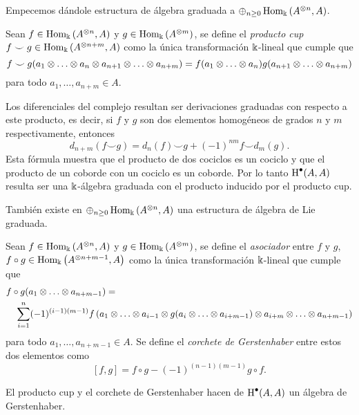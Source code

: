 \documentclass[a4paper,oneside,fleqn,11pt,../tesis.tex]{subfiles}
\begin{document}
Empecemos dándole estructura de álgebra graduada a $\oplus_{n \geq 0}\operatorname{Hom}_{\Bbbk}\left(A^{\otimes n}, A\right)$.
\begin{definition}
	Sean $f \in \operatorname{Hom}_{\Bbbk}\left(A^{\otimes n}, A\right)$ y $g \in \operatorname{Hom}_{\Bbbk}\left(A^{\otimes m}\right)$, se define el \emph{producto cup}
	$f \smile g \in \operatorname{Hom}_{\Bbbk}\left(A^{\otimes n + m}, A\right)$ como la única transformación $\Bbbk$-lineal que cumple que
	\[
		f\smile g(a_1\otimes \ldots \otimes a_n \otimes a_{n + 1} \otimes \ldots \otimes a_{n + m}) = f(a_1\otimes \ldots \otimes a_n)g(a_{n + 1} \otimes \ldots \otimes a_{n + m})
	\]
	para todo $a_1, \ldots, a_{n + m} \in A$.
\end{definition}
Los diferenciales del complejo resultan ser derivaciones graduadas con respecto a este producto, es decir, si $f$ y $g$ son dos
elementos homogéneos de grados $n$ y $m$ respectivamente, entonces
\[
	d_{n + m}(f \smile g) = d_{n}(f) \smile g + (-1)^{nm}f \smile d_{m}(g).
\]
Esta fórmula muestra que el producto de dos cociclos es un cociclo y que el producto de un coborde con un cociclo
es un coborde. Por lo tanto $\operatorname{H}^{\bullet}(A,A)$ resulta ser una $\Bbbk$-álgebra graduada con el producto inducido por el producto cup.

También existe en $\oplus_{n \geq 0}\operatorname{Hom}_{\Bbbk}\left(A^{\otimes n}, A\right)$ una estructura de álgebra de Lie graduada.
\begin{definition}
Sean $f \in \operatorname{Hom}_{\Bbbk}\left(A^{\otimes n}, A\right)$ y $g \in \operatorname{Hom}_{\Bbbk}\left(A^{\otimes m}\right)$, se define el \emph{asociador}
entre $f$ y $g$, $f \circ g \in \operatorname{Hom}_{\Bbbk}\left(A^{\otimes n + m - 1}, A\right)$ como la única transformación $\Bbbk$-lineal que cumple que
	\begin{align*}
		&f \circ g (a_1\otimes \ldots \otimes a_{n + m - 1 }) = \\
		&\quad\sum_{i = 1}^n (-1)^{(i - 1)(m -1)}
				f\left(a_1\otimes \ldots \otimes a_{i - 1} \otimes g(a_{i} \otimes \ldots \otimes a_{i + m - 1}) \otimes a_{i + m} \otimes \ldots \otimes a_{n + m - 1}\right)
	\end{align*}
	para todo $a_1, \ldots, a_{n + m - 1} \in A$.
Se define el \emph{corchete de Gerstenhaber} entre estos dos elementos como
\[
	\left[f, g\right] = f \circ g  - (-1)^{(n -1)(m -1)}g \circ f.
\] 
\end{definition}

El producto cup y el corchete de Gerstenhaber hacen de $\operatorname{H}^{\bullet}(A, A)$ un álgebra de Gerstenhaber.
\end{document}
